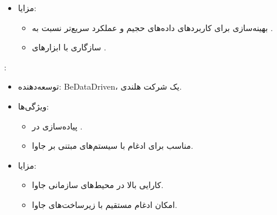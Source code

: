\documentclass[11pt, a4paper, oneside]{book}
\newcounter{itemadded}
\let\LaTeXStandardEnumerateBegin\enumerate
\let\LaTeXStandardEnumerateEnd\endenumerate
\renewenvironment{enumerate}{%
	\LaTeXStandardEnumerateBegin%
	\setcounter{itemadded}{0}
}{%
	\LaTeXStandardEnumerateEnd%
}%
\begin{document}
\begin{enumerate}
\begin{itemize}
\begin{itemize}
						\item یک پیاده‌سازی جایگزین برای  با هدف افزایش سرعت اجرا.
						
						\item از  برای اجرای سریع‌تر کدها بهره می‌برد.
						
					\end{itemize}
					
					\item {\large مزایا}:
					
					\begin{itemize}
						
						\item بهینه‌سازی برای کاربردهای داده‌های حجیم و عملکرد سریع‌تر نسبت به .
						
						\item سازگاری با ابزارهای .
						
					\end{itemize}
					
				\end{itemize}
				
				
				\item {\large {}}:
				
				\begin{itemize}
					
					\item  {\large توسعه‌دهنده}:
					{\normalsize BeDataDriven، یک شرکت هلندی.}
					
					\item {\large ویژگی‌ها}:
					
					\begin{itemize}
						
						\item پیاده‌سازی  در .
						
						\item مناسب برای ادغام با سیستم‌های مبتنی بر جاوا.
						
					\end{itemize}
					
					\item {\large مزایا}:
					
					\begin{itemize}
						
						\item کارایی بالا در محیط‌های سازمانی جاوا.
						
						\item امکان ادغام مستقیم با زیرساخت‌های جاوا.
						

\end{itemize}
\end{itemize}
\end{enumerate}
\end{document}
